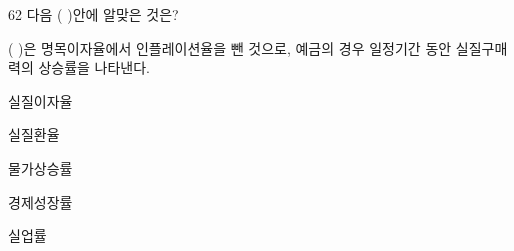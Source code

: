 \begin{question}{62}
다음 ( )안에 알맞은 것은?
\begin{framedtext}
( )은 명목이자율에서 인플레이션율을 뺀 것으로, 예금의 경우 일정기간 동안 실질구매력의 상승률을 나타낸다.
\end{framedtext}
\begin{choices}
  \item 실질이자율
  \item 실질환율
  \item 물가상승률
  \item 경제성장률
  \item 실업률
\end{choices}
\end{question}
